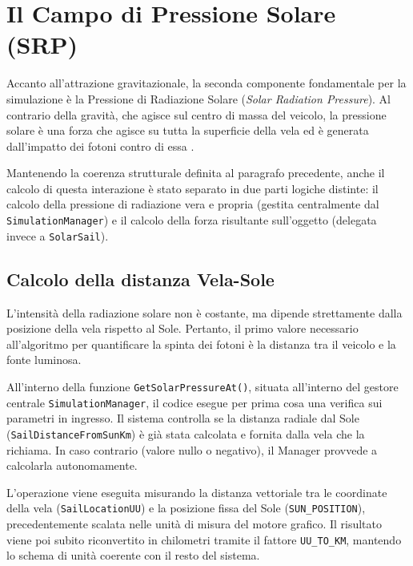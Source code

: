 
\section{Il Campo di Pressione Solare (SRP)}

Accanto all'attrazione gravitazionale, la seconda componente fondamentale per la simulazione è la Pressione di Radiazione Solare (\textit{Solar Radiation Pressure}). Al contrario della gravità, che agisce sul centro di massa del veicolo, la pressione solare è una forza che agisce su tutta la superficie della vela ed è generata dall'impatto dei fotoni contro di essa \cite{mcinnes1999solar}. 

Mantenendo la coerenza strutturale definita al paragrafo precedente, anche il calcolo di questa interazione è stato separato in due parti logiche distinte: il calcolo della pressione di radiazione vera e propria (gestita centralmente dal \lstinline|SimulationManager|) e il calcolo della forza risultante sull'oggetto (delegata invece a \lstinline|SolarSail|).


\subsection{Calcolo della distanza Vela-Sole}

L'intensità della radiazione solare non è costante, ma dipende strettamente dalla posizione della vela rispetto al Sole. Pertanto, il primo valore necessario all'algoritmo per quantificare la spinta dei fotoni è la distanza tra il veicolo e la fonte luminosa.

All'interno della funzione \lstinline|GetSolarPressureAt()|, situata all'interno del gestore centrale \lstinline|SimulationManager|, il codice esegue per prima cosa una verifica sui parametri in ingresso. Il sistema controlla se la distanza radiale dal Sole (\lstinline|SailDistanceFromSunKm|) è già stata calcolata e fornita dalla vela che la richiama. In caso contrario (valore nullo o negativo), il Manager provvede a calcolarla autonomamente.

L'operazione viene eseguita misurando la distanza vettoriale tra le coordinate della vela (\lstinline|SailLocationUU|) e la posizione fissa del Sole (\lstinline|SUN_POSITION|), precedentemente scalata nelle unità di misura del motore grafico. Il risultato viene poi subito riconvertito in chilometri tramite il fattore \lstinline|UU_TO_KM|, mantendo lo schema di unità coerente con il resto del sistema.

